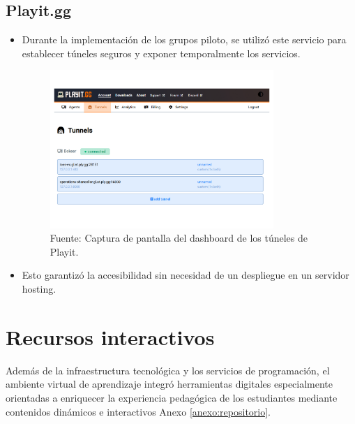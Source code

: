 \documentclass[letter,oneside,12pt,spanish]{report}
\begin{document}
\subsection{Playit.gg}
\begin{itemize}
    \item Durante la implementación de los grupos piloto, se utilizó este servicio para establecer túneles seguros y exponer temporalmente los servicios.
    
	\begin{figure}[ht]
		\centering
		\includegraphics[width=0.8\textwidth]{Figs/dashboard playit.gg.pdf}
		\label{fig:Playit}
		\\Fuente: Captura de pantalla del dashboard de los túneles de Playit.
\end{figure}
	
	\item Esto garantizó la accesibilidad sin necesidad de un despliegue en un servidor hosting.
\end{itemize}

\section{Recursos interactivos}

Además de la infraestructura tecnológica y los servicios de programación, el ambiente virtual de aprendizaje integró herramientas digitales especialmente orientadas a enriquecer la experiencia pedagógica de los estudiantes mediante contenidos dinámicos e interactivos Anexo \ref{anexo:repositorio}.
\end{document}

